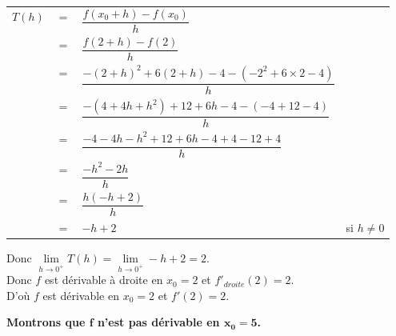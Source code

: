 \begin{itemize}
\begin{tabular}{llll}
$T(h)$ & $=$ & $\dfrac{f(x_0 + h) - f(x_0)}{h}$ & \\
& $=$ & $\dfrac{f(2 + h) - f(2)}{h}$ & \\
& $=$ & $\dfrac{-(2+h)^2 + 6(2+h) -4 -\left(-2^2 + 6 \times 2 - 4 \right)}{h}$ & \\
& $=$ & $\dfrac{-\left(4 + 4h + h^2\right) + 12 + 6h -4 - \left(-4 + 12 - 4\right)}{h}$ & \\
& $=$ & $\dfrac{-4 -4h - h^2 + 12 + 6h -4 + 4 - 12 + 4}{h}$ & \\
& $=$ & $\dfrac{-h^2 - 2h}{h}$ & \vspace*{.3cm}\\
& $=$ & $\dfrac{h\left(-h+2\right)}{h}$ & \\
& $=$ & $-h + 2$ & si $h\neq 0$ \\
\end{tabular}

\vspace*{.3cm}

Donc $\lim\limits_{h \to 0^+} T(h) = \lim\limits_{h \to 0^+} -h + 2 = 2$. \\

Donc $f$ est dérivable à droite en $x_0 = 2$ et $f'_{droite}\left(2\right) = 2$. \\

D'où $f$ est dérivable en $x_0 = 2$ et $f'(2) = 2$.
\end{itemize}

\newpage

\vspace*{-1.1cm}

\textbf{Montrons que $\mathbf{f}$ n'est pas dérivable en $\mathbf{x_0 = 5}$.} \\

